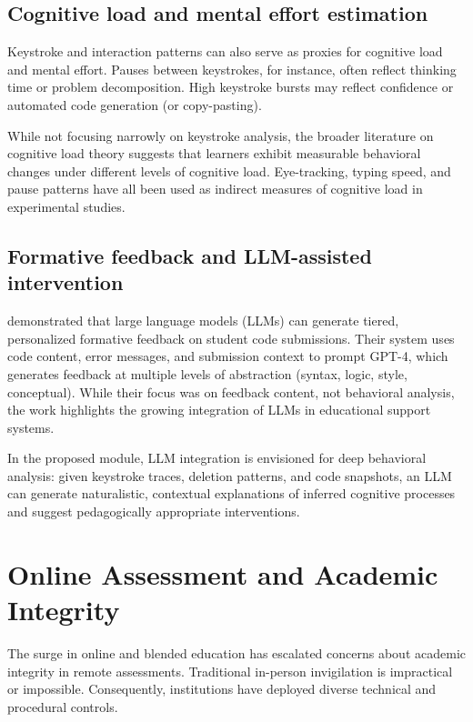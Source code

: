 \subsection{Cognitive load and mental effort estimation}

Keystroke and interaction patterns can also serve as proxies for cognitive load and mental effort. Pauses between keystrokes, for instance, often reflect thinking time or problem decomposition. High keystroke bursts may reflect confidence or automated code generation (or copy-pasting).

While not focusing narrowly on keystroke analysis, the broader literature on cognitive load theory \citep{sweller1988cognitive} suggests that learners exhibit measurable behavioral changes under different levels of cognitive load. Eye-tracking, typing speed, and pause patterns have all been used as indirect measures of cognitive load in experimental studies.

\subsection{Formative feedback and LLM-assisted intervention}

\citet{nguyen2023gpt4} demonstrated that large language models (LLMs) can generate tiered, personalized formative feedback on student code submissions. Their system uses code content, error messages, and submission context to prompt GPT-4, which generates feedback at multiple levels of abstraction (syntax, logic, style, conceptual). While their focus was on feedback content, not behavioral analysis, the work highlights the growing integration of LLMs in educational support systems.

In the proposed module, LLM integration is envisioned for deep behavioral analysis: given keystroke traces, deletion patterns, and code snapshots, an LLM can generate naturalistic, contextual explanations of inferred cognitive processes and suggest pedagogically appropriate interventions.

\section{Online Assessment and Academic Integrity}
\label{sec:online-assessment}

The surge in online and blended education has escalated concerns about academic integrity in remote assessments. Traditional in-person invigilation is impractical or impossible. Consequently, institutions have deployed diverse technical and procedural controls.

